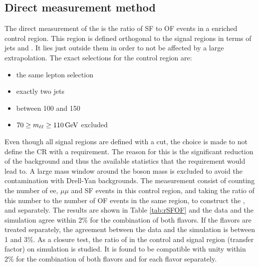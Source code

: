 \subsection*{Direct measurement method}\label{sec:rsfofDirect}
\noindent
\justify
The direct measurement of the \Rsfof is the ratio of SF to OF events in a \ttbar enriched control region. 
This region is defined orthogonal to the signal regions in terms of jets and \ptmiss. 
It lies just outside them in order to not be affected by a large extrapolation. 
The exact selections for the \ttbar control region are:
\begin{itemize}
    \item the same lepton selection
    \item exactly two jets
    \item \ptmiss between 100 and 150\GeV
    \item $70\geq m_{\ell\ell}\geq110\,\text{Ge\hspace{-.08em}V}$ excluded
\end{itemize}                                 
Even though all signal regions are defined with a \mttwo cut, the choice is made to not define the \ttbar CR with a \mttwo requirement. 
The reason for this is the significant reduction of the \ttbar background and thus the available statistics that the \mttwo requirement would lead to.
A large mass window around the \PZ boson mass is excluded to avoid the contamination with Drell-Yan backgrounds. 
The measurement consist of counting the number of ee, $\mu\mu$ and SF events in this control region, and taking the ratio of this number to the number of OF events in the same region, to construct the \Reeof, \Rmmof and \Rsfof separately. 
\newpara
\noindent\justify
The results are shown in Table \ref{tab:rSFOF} and the data and the simulation agree within 2\% for the combination of both flavors. 
If the flavors are treated separately, the agreement between the data and the simulation is between 1 and 3\%. 
As a closure test, the ratio of \Rsfof in the control and signal region (transfer factor) on simulation is studied. 
It is found to be compatible with unity within 2\%  for the combination of both flavors and for each flavor separately.
